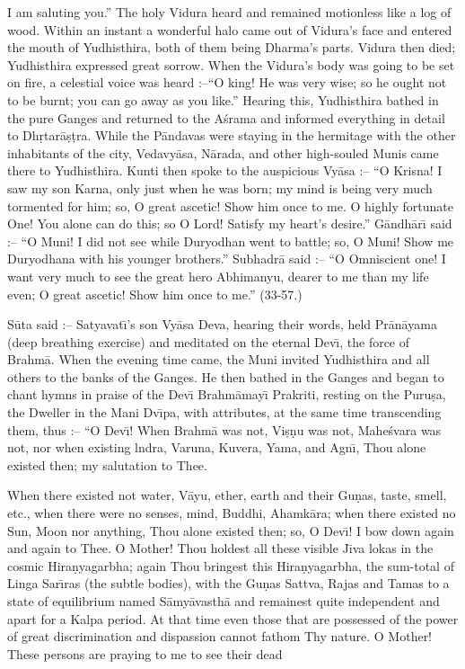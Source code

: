 I am saluting you.'' The holy Vidura heard and remained motionless like a log of wood. Within an instant a wonderful halo came out of Vidura's face and entered the mouth of Yudhisthira, both of them being Dharma's parts. Vidura then died; Yudhisthira expressed great sorrow. When the Vidura's body was going to be set on fire, a celestial voice was heard :--``O king! He was very wise; so he ought not to be burnt; you can go away as you like.'' Hearing this, Yudhisthira bathed in the pure Ganges and returned to the A\'srama and informed everything in detail to Dh\d{r}tar\=a\d{s}\d{t}ra. While the P\=andavas were staying in the hermitage with the other inhabitants of the city, Vedavy\=asa, N\=arada, and other high-souled Munis came there to Yudhisthira. Kunti then spoke to the auspicious Vy\=asa :-- ``O Krisna! I saw my son Karna, only just when he was born; my mind is being very much tormented for him; so, O great ascetic! Show him once to me. O highly fortunate One! You alone can do this; so O Lord! Satisfy my heart's desire.'' G\=andh\=ar\={\i} said :-- ``O Muni! I did not see while Duryodhan went to battle; so, O Muni! Show me Duryodhana with his younger brothers.'' Subhadr\=a said :-- ``O Omniscient one! I want very much to see the great hero Abhimanyu, dearer to me than my life even; O great ascetic! Show him once to me.'' (33-57.)

S\=uta said :-- Satyavat\={\i}'s son Vy\=asa Deva, hearing their words, held Pr\=an\=ayama (deep breathing exercise) and meditated on the eternal Dev\={\i}, the force of Brahm\=a. When the evening time came, the Muni invited Yudhisthira and all others to the banks of the Ganges. He then bathed in the Ganges and began to chant hymns in praise of the Dev\={\i} Brahm\=amay\={\i} Prakriti, resting on the Puru\d{s}a, the Dweller in the Mani Dv\={\i}pa, with attributes, at the same time transcending them, thus :-- ``O Dev\={\i}! When Brahm\=a was not, Vi\d{s}\d{n}u was not, Mahe\'svara was not, nor when existing lndra, Varuna, Kuvera, Yama, and Agn\={\i}, Thou alone existed then; my salutation to Thee.

When there existed not water, V\=ayu, ether, earth and their Gu\d{n}as, taste, smell, etc., when there were no senses, mind, Buddhi, Ahamk\=ara; when there existed no Sun, Moon nor anything, Thou alone existed then; so, O Dev\={\i}! I bow down again and again to Thee. O Mother! Thou holdest all these visible J\={\i}va lokas in the cosmic Hira\d{n}yagarbha; again Thou bringest this Hira\d{n}yagarbha, the sum-total of Linga Sar\={\i}ras (the subtle bodies), with the Gu\d{n}as Sattva, Rajas and Tamas to a state of equilibrium named S\=amy\=avasth\=a and remainest quite independent and apart for a Kalpa period. At that time even those that are possessed of the power of great discrimination and dispassion cannot fathom Thy nature. O Mother! These persons are praying to me to see their dead

